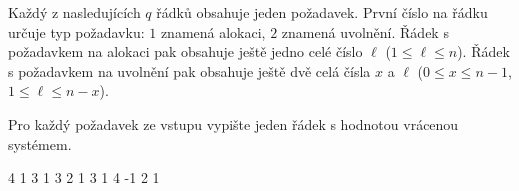 Každý z nasledujících $q$ řádků obsahuje jeden požadavek.
První číslo na řádku určuje typ požadavku: $1$ znamená alokaci, $2$ znamená uvolnění.
Řádek s požadavkem na alokaci pak obsahuje ještě jedno celé číslo $\ell$ ($1 \leq \ell \leq n$).
Řádek s požadavkem na uvolnění pak obsahuje ještě dvě celá čísla $x$ a $\ell$ ($0 \leq x \leq n-1$, $1 \leq \ell \leq n-x$).



Pro každý požadavek ze vstupu vypište jeden řádek s hodnotou vrácenou systémem.



 4
1 3
1 3
2 1 3
1 4
-1
2
1
\sampleEND



